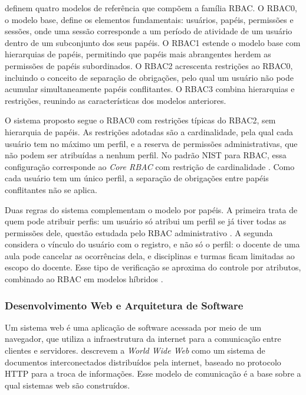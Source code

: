 \documentclass[
	12pt,				%
	twoside,			%
	openany,			%
	a4paper,			%
	chapter=TITLE,		%
	section=TITLE,		%
	subsection=TITLE,	%
	subsubsection=TITLE,%
	english,			%
	french,				%
	spanish,			%
	brazil,				%
	]{abntex2}
\begin{document}
 definem quatro modelos de referência que compõem a família RBAC. O RBAC0, o modelo base, define os elementos fundamentais: usuários, papéis, permissões e sessões, onde uma sessão corresponde a um período de atividade de um usuário dentro de um subconjunto dos seus papéis. O RBAC1 estende o modelo base com hierarquias de papéis, permitindo que papéis mais abrangentes herdem as permissões de papéis subordinados. O RBAC2 acrescenta restrições ao RBAC0, incluindo o conceito de separação de obrigações, pelo qual um usuário não pode acumular simultaneamente papéis conflitantes. O RBAC3 combina hierarquias e restrições, reunindo as características dos modelos anteriores.

O sistema proposto segue o RBAC0 com restrições típicas do RBAC2, sem hierarquia de papéis. As restrições adotadas são a cardinalidade, pela qual cada usuário tem no máximo um perfil, e a reserva de permissões administrativas, que não podem ser atribuídas a nenhum perfil. No padrão NIST para RBAC, essa configuração corresponde ao \textit{Core RBAC} com restrição de cardinalidade \cite{ferraiolo2001nist}. Como cada usuário tem um único perfil, a separação de obrigações entre papéis conflitantes não se aplica.

Duas regras do sistema complementam o modelo por papéis. A primeira trata de quem pode atribuir perfis: um usuário só atribui um perfil se já tiver todas as permissões dele, questão estudada pelo RBAC administrativo \cite{sandhu1999arbac97}. A segunda considera o vínculo do usuário com o registro, e não só o perfil: o docente de uma aula pode cancelar as ocorrências dela, e disciplinas e turmas ficam limitadas ao escopo do docente. Esse tipo de verificação se aproxima do controle por atributos, combinado ao RBAC em modelos híbridos \cite{kuhn2010attributes}.

\subsubsection{Desenvolvimento Web e Arquitetura de Software}
\label{sec:web}

Um sistema web é uma aplicação de software acessada por meio de um navegador, que utiliza a infraestrutura da internet para a comunicação entre clientes e servidores.  descrevem a \textit{World Wide Web} como um sistema de documentos interconectados distribuídos pela internet, baseado no protocolo HTTP para a troca de informações. Esse modelo de comunicação é a base sobre a qual sistemas web são construídos.
\end{document}
